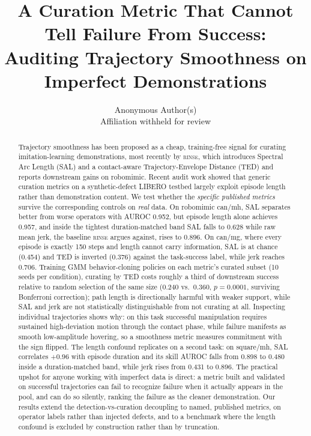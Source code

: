 \documentclass[10pt]{article}
\title{A Curation Metric That Cannot Tell Failure From Success:\\
Auditing Trajectory Smoothness on Imperfect Demonstrations}
\author{Anonymous Author(s)\\ \small Affiliation withheld for review}
\date{}
\newcommand{\rinse}{\textsc{rinse}}
\begin{document}
\maketitle

\begin{abstract}
Trajectory smoothness has been proposed as a cheap, training-free signal for
curating imitation-learning demonstrations, most recently by \rinse{}, which
introduces Spectral Arc Length (SAL) and a contact-aware Trajectory-Envelope
Distance (TED) and reports downstream gains on robomimic. Recent audit work
showed that generic curation metrics on a synthetic-defect LIBERO testbed
largely exploit episode length rather than demonstration content. We test
whether the \emph{specific published metrics} survive the corresponding
controls on \emph{real} data. On robomimic can/mh, SAL separates
better from worse operators with AUROC 0.952, but episode length alone
achieves 0.957, and inside the tightest duration-matched band SAL falls to
0.628 while raw mean jerk, the baseline \rinse{} argues
against, rises to 0.896. On can/mg, where every episode is exactly 150
steps and length cannot carry information, SAL is at chance (0.454) and TED
is inverted (0.376) against the task-success label, while jerk reaches
0.706. Training GMM behavior-cloning policies on each metric's curated
subset (10 seeds per condition), curating by TED costs roughly a third of
downstream success relative to random selection of the same size (0.240
vs.\ 0.360, $p{=}0.0001$, surviving Bonferroni correction); path length is
directionally harmful with weaker support, while SAL and jerk are not
statistically distinguishable from not curating at all.
Inspecting individual trajectories shows why: on this task successful
manipulation requires sustained high-deviation motion through the contact
phase, while failure manifests as smooth low-amplitude hovering, so a
smoothness metric measures commitment with the sign flipped. The length
confound replicates on a second task: on square/mh, SAL correlates $+0.96$
with episode duration and its skill AUROC falls from 0.898 to 0.480 inside a
duration-matched band, while jerk rises from 0.431 to 0.896. The practical
upshot for anyone working with imperfect data is direct: a metric built and
validated on successful trajectories can fail to recognize failure when it
actually appears in the pool, and can do so silently, ranking the failure as
the cleaner demonstration. Our results extend the detection-vs-curation
decoupling to named, published metrics, on operator labels rather than
injected defects, and to a benchmark where the length confound is excluded
by construction rather than by truncation.
\end{abstract}
\end{document}
